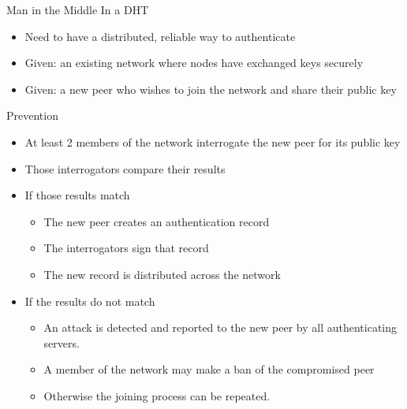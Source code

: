 \documentclass[11pt]{beamer}
\begin{document}
\begin{frame}{Man in the Middle In a DHT}

	\begin{itemize}
		\item Need to have a distributed, reliable way to authenticate 
		\item  Given: an existing network where nodes have exchanged keys securely
		\item  Given: a new peer who wishes to join the network and share their public key
	
	\end{itemize}


\end{frame}



\begin{frame}{Prevention}

	\begin{itemize}
		\item  At least 2 members of the network interrogate the new peer for its public key
		\item  Those interrogators compare their results
		\item  If those results match
		\begin{itemize}
		
		    \item The new peer creates an authentication record
		    \item The interrogators sign that record
		    \item The new record is distributed across the network
		\end{itemize}
		
		
		\item  If the results do not match
		\begin{itemize}
		
		    \item An attack is detected and reported to the new peer by all authenticating servers.
		    \item A member of the network may make a ban of the compromised peer
		    \item Otherwise the joining process can be repeated.
		\end{itemize}
		
	\end{itemize}


\end{frame}
\end{document}

